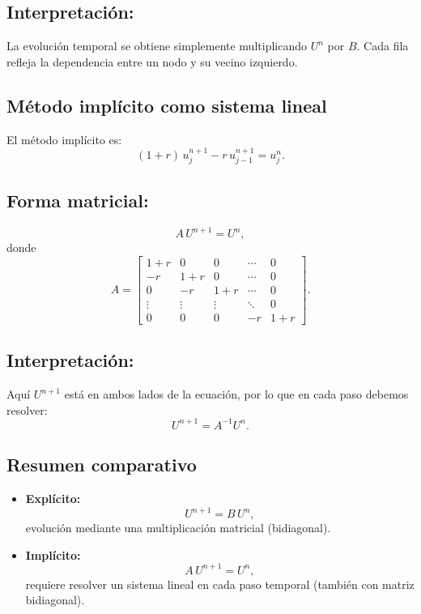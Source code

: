 \documentclass[12pt,a4paper]{article}
\begin{document}
\subsection*{Interpretación:}
La evolución temporal se obtiene simplemente multiplicando $U^n$ por $B$. Cada fila refleja la dependencia entre un nodo y su vecino izquierdo.

\subsection{Método implícito como sistema lineal}

El método implícito es:
\[
(1+r)\,u_j^{n+1} - r\,u_{j-1}^{n+1} = u_j^n.
\]

\subsection*{Forma matricial:}
\[
A\,U^{n+1} = U^n,
\]
donde
\[
A = 
\begin{bmatrix}
1+r & 0   & 0   & \cdots & 0 \\[4pt]
-r  & 1+r & 0   & \cdots & 0 \\[4pt]
0   & -r  & 1+r & \cdots & 0 \\[4pt]
\vdots & \vdots & \vdots & \ddots & 0 \\[4pt]
0   & 0   & 0   & -r     & 1+r
\end{bmatrix}.
\]

\subsection*{Interpretación:}
Aquí $U^{n+1}$ está en ambos lados de la ecuación, por lo que en cada paso debemos resolver:
\[
U^{n+1} = A^{-1} U^n.
\]

\subsection{Resumen comparativo}

\begin{itemize}
    \item \textbf{Explícito:}  
    \[
    U^{n+1} = B\,U^n,
    \]
    evolución mediante una multiplicación matricial (bidiagonal).

    \item \textbf{Implícito:}  
    \[
    A\,U^{n+1} = U^n,
    \]
    requiere resolver un sistema lineal en cada paso temporal (también con matriz bidiagonal).
\end{itemize}
\end{document}
